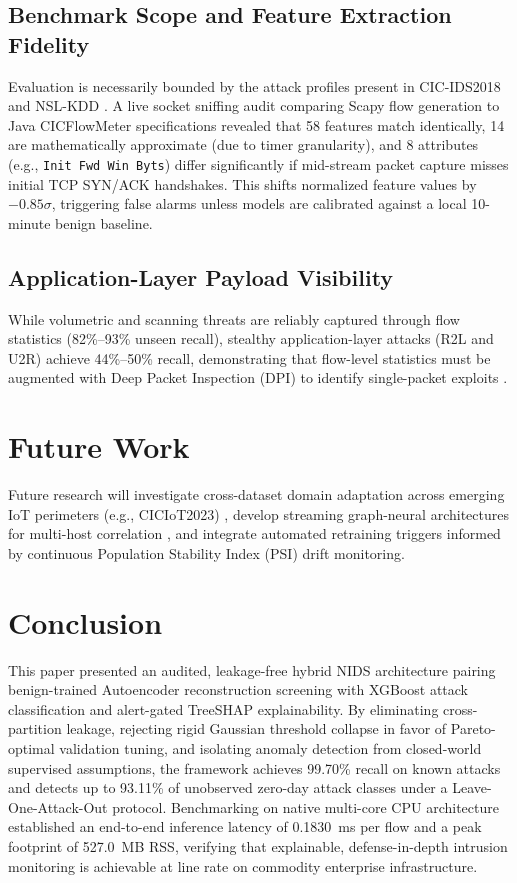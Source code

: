 \documentclass[journal]{IEEEtran}
\begin{document}
\subsection{Benchmark Scope and Feature Extraction Fidelity}
Evaluation is necessarily bounded by the attack profiles present in CIC-IDS2018 and NSL-KDD \cite{ahmed2026,neupane2022}. A live socket sniffing audit comparing Scapy flow generation to Java CICFlowMeter specifications revealed that 58 features match identically, 14 are mathematically approximate (due to timer granularity), and 8 attributes (e.g., \texttt{Init Fwd Win Byts}) differ significantly if mid-stream packet capture misses initial TCP SYN/ACK handshakes. This shifts normalized feature values by $-0.85\sigma$, triggering false alarms unless models are calibrated against a local 10-minute benign baseline.

\subsection{Application-Layer Payload Visibility}
While volumetric and scanning threats are reliably captured through flow statistics (82\%--93\% unseen recall), stealthy application-layer attacks (R2L and U2R) achieve 44\%--50\% recall, demonstrating that flow-level statistics must be augmented with Deep Packet Inspection (DPI) to identify single-packet exploits \cite{hozouri2025}.

\section{Future Work}
Future research will investigate cross-dataset domain adaptation across emerging IoT perimeters (e.g., CICIoT2023) \cite{shirley2025,alsubaei2025}, develop streaming graph-neural architectures for multi-host correlation \cite{amin2025,kamal2026}, and integrate automated retraining triggers informed by continuous Population Stability Index (PSI) drift monitoring.

\section{Conclusion}
This paper presented an audited, leakage-free hybrid NIDS architecture pairing benign-trained Autoencoder reconstruction screening with XGBoost attack classification and alert-gated TreeSHAP explainability. By eliminating cross-partition leakage, rejecting rigid Gaussian threshold collapse in favor of Pareto-optimal validation tuning, and isolating anomaly detection from closed-world supervised assumptions, the framework achieves 99.70\% recall on known attacks and detects up to 93.11\% of unobserved zero-day attack classes under a Leave-One-Attack-Out protocol. Benchmarking on native multi-core CPU architecture established an end-to-end inference latency of 0.1830~ms per flow and a peak footprint of 527.0~MB RSS, verifying that explainable, defense-in-depth intrusion monitoring is achievable at line rate on commodity enterprise infrastructure.
\end{document}
